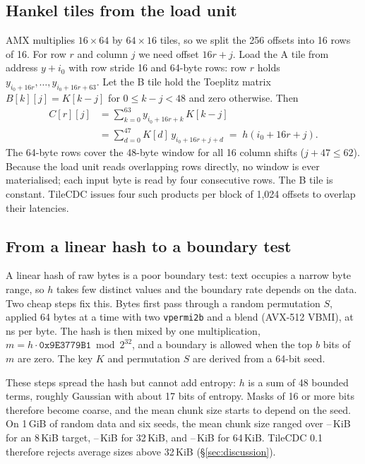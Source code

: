 \documentclass[10pt,twocolumn]{article}
\begin{document}
\subsection{Hankel tiles from the load unit}
AMX multiplies $16\times64$ by $64\times16$ tiles, so we split the 256 offsets into 16 rows of 16. For row $r$ and column $j$ we need offset $16r+j$. Load the A tile from address $y+i_0$ with row stride 16 and 64-byte rows: row $r$ holds $y_{i_0+16r},\dots,y_{i_0+16r+63}$. Let the B tile hold the Toeplitz matrix $B[k][j]=K[k-j]$ for $0\le k-j<48$ and zero otherwise. Then
\begin{align}
C[r][j] &= \sum_{k=0}^{63} y_{i_0+16r+k}\,K[k-j] \nonumber\\
        &= \sum_{d=0}^{47} K[d]\,y_{i_0+16r+j+d} \;=\; h(i_0{+}16r{+}j).
\end{align}
The 64-byte rows cover the 48-byte window for all 16 column shifts ($j+47\le 62$). Because the load unit reads overlapping rows directly, no window is ever materialised; each input byte is read by four consecutive rows. The B tile is constant. TileCDC issues four such products per block of 1,024 offsets to overlap their latencies.

\subsection{From a linear hash to a boundary test}\label{sec:mix}
A linear hash of raw bytes is a poor boundary test: text occupies a narrow byte range, so $h$ takes few distinct values and the boundary rate depends on the data. Two cheap steps fix this. Bytes first pass through a random permutation $S$, applied 64 bytes at a time with two \texttt{vpermi2b} and a blend (AVX-512 VBMI), at \brSbox\,ns per byte. The hash is then mixed by one multiplication, $m=h\cdot\texttt{0x9E3779B1} \bmod 2^{32}$, and a boundary is allowed when the top $b$ bits of $m$ are zero. The key $K$ and permutation $S$ are derived from a 64-bit seed.

These steps spread the hash but cannot add entropy: $h$ is a sum of 48 bounded terms, roughly Gaussian with about 17 bits of entropy. Masks of 16 or more bits therefore become coarse, and the mean chunk size starts to depend on the seed. On 1\,GiB of random data and six seeds, the mean chunk size ranged over \seedEightLo--\seedEightHi\,KiB for an 8\,KiB target, \seedThirtyTwoLo--\seedThirtyTwoHi\,KiB for 32\,KiB, and \seedSixtyFourLo--\seedSixtyFourHi\,KiB for 64\,KiB. TileCDC 0.1 therefore rejects average sizes above 32\,KiB (\S\ref{sec:discussion}).
\end{document}
